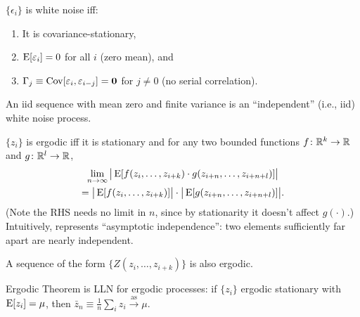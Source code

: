 \documentclass[8pt,letterpaper, landscape]{extarticle} %
\newcommand{\mzero}{\ensuremath{\mathbf{0}}}
\begin{document}
\begin{multicols}{3}
\begin{description}
 $ \{ \epsilon_i \} $ is white noise iff:
\begin{enumerate}
\item It is covariance-stationary,
\item $ \operatorname{E} [\varepsilon_i] = 0 $ for all $ i $ (zero mean), and
\item $ \Gamma_{j} \equiv \Cov [\epsilon_i , \epsilon_{i-j} ] = \mzero $ for $ j \neq 0 $ (no serial correlation).
\end{enumerate}
An iid sequence with mean zero and finite variance is an ``independent'' (i.e., iid) white noise process.

 $ \{ z_i \} $ is ergodic iff it is stationary and for any two bounded functions $ f \colon \mathbb{R}^{k} \to \mathbb{R} $ and $ g \colon \mathbb{R}^{l} \to \mathbb{R} $,
\begin{multline*}
\lim_{n \to \infty} \big \lvert \operatorname{E} [f(z_i, \dotsc , z_{i + k}) \cdot g(z_{i+n}, \dotsc , z_{i + n + l})] \big \rvert \\
= \big \lvert \operatorname{E} [f(z_i, \dotsc , z_{i + k})] \big \rvert \cdot \big \lvert \operatorname{E} [g(z_{i+n}, \dotsc , z_{i + n + l})] \big \rvert .
\end{multline*}
(Note the RHS needs no limit in $ n $, since by stationarity it doesn't affect $ g(\cdot) $.) Intuitively, represents ``asymptotic independence'': two elements sufficiently far apart are nearly independent.

A sequence of the form $ \{ Z(z_i, \dotsc , z_{i+k}) \} $ is also ergodic.

Ergodic Theorem is LLN for ergodic processes: if $ \{ z_i \} $ ergodic stationary with $ \operatorname{E} [z_i] = \mu $, then $ \bar{z}_n \equiv \tfrac{1}{n} \sum_{i} z_i \xrightarrow{\text{as}} \mu $.


\end{description}
\end{multicols}
\end{document}
